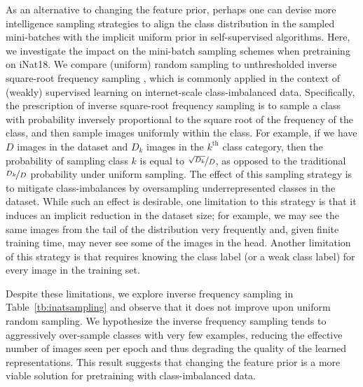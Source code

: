 \documentclass{article} %
\begin{document}
As an alternative to changing the feature prior, perhaps one can devise more intelligence sampling strategies to align the class distribution in the sampled mini-batches with the implicit uniform prior in self-supervised algorithms.
Here, we investigate the impact on the mini-batch sampling schemes when pretraining on iNat18. 
We compare (uniform) random sampling to unthresholded inverse square-root frequency sampling \citep{https://doi.org/10.48550/arxiv.1310.4546}, which is commonly applied in the context of (weakly) supervised learning on internet-scale class-imbalanced data.
Specifically, the prescription of inverse square-root frequency sampling is to sample a class with probability inversely proportional to the square root of the frequency of the class, and then sample images uniformly within the class.
For example, if we have $D$ images in the dataset and $D_k$ images in the $k^{\text{th}}$ class category, then the probability of sampling class $k$ is equal to $\nicefrac{\sqrt{D_k}}{D}$, as opposed to the traditional $\nicefrac{D_k}{D}$ probability under uniform sampling.
The effect of this sampling strategy is to mitigate class-imbalances by oversampling underrepresented classes in the dataset.
While such an effect is desirable, one limitation to this strategy is that it induces an implicit reduction in the dataset size; for example, we may see the same images from the tail of the distribution very frequently and, given finite training time, may never see some of the images in the head.
Another limitation of this strategy is that requires knowing the class label (or a weak class label) for every image in the training set.

Despite these limitations, we explore inverse frequency sampling in Table~\ref{tb:inatsampling} and observe that it does not improve upon uniform random sampling.
We hypothesize the inverse frequency sampling tends to aggressively over-sample classes with very few examples, reducing the effective number of images seen per epoch and thus degrading the quality of the learned representations.
This result suggests that changing the feature prior is a more viable solution for pretraining with class-imbalanced data.
\end{document}
